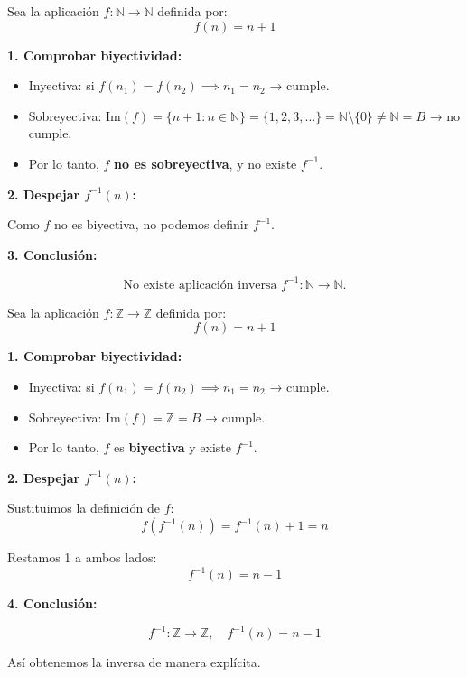 \documentclass[a4paper,12pt]{article}
\begin{document}
\begin{ejemplo}[title=Ejemplo 1: No Existe Aplicación Inversa]
Sea la aplicación \(f: \mathbb{N} \to \mathbb{N}\) definida por:
\[
f(n) = n+1
\]

\textbf{1. Comprobar biyectividad:}  

\begin{itemize}
    \item Inyectiva: si \(f(n_1) = f(n_2) \implies n_1 = n_2\) → cumple.  
    \item Sobreyectiva: \(\text{Im}(f) = \{ n+1 : n \in \mathbb{N} \} = \{1,2,3,\dots\} = \mathbb{N} \setminus \{0\} \neq \mathbb{N} = B\) → no cumple.
    \item Por lo tanto, \(f\) \textbf{no es sobreyectiva}, y no existe \(f^{-1}\).
\end{itemize}

\textbf{2. Despejar \(f^{-1}(n)\):}  

Como \(f\) no es biyectiva, no podemos definir \(f^{-1}\).  

\textbf{3. Conclusión:}  

\[
\text{No existe aplicación inversa } f^{-1} : \mathbb{N} \to \mathbb{N}.
\]

\end{ejemplo}

\begin{ejemplo}[title=Ejemplo 2: Existe Aplicación Inversa]
Sea la aplicación \(f: \mathbb{Z} \to \mathbb{Z}\) definida por:
\[
f(n) = n+1
\]

\textbf{1. Comprobar biyectividad:}  

\begin{itemize}
    \item Inyectiva: si \(f(n_1) = f(n_2) \implies n_1 = n_2\) → cumple.  
    \item Sobreyectiva: \(\text{Im}(f) = \mathbb{Z} = B\) → cumple. 
    \item Por lo tanto, \(f\) es \textbf{biyectiva} y existe \(f^{-1}\).
\end{itemize}

\textbf{2. Despejar \(f^{-1}(n)\):}  

Sustituimos la definición de \(f\):
\[
f(f^{-1}(n)) = f^{-1}(n) + 1 = n
\]

Restamos 1 a ambos lados:
\[
f^{-1}(n) = n - 1
\]

\textbf{4. Conclusión:}  

\[
\boxed{f^{-1} : \mathbb{Z} \to \mathbb{Z}, \quad f^{-1}(n) = n-1}
\]

Así obtenemos la inversa de manera explícita.
\end{ejemplo}
\end{document}
